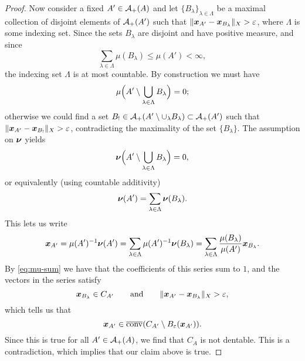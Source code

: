 \begin{proof}
  Now consider a fixed $A' \in \mathcal{A}_{+}(A)$ and let $\{B_{\lambda}\}_{\lambda \in \Lambda}$ be a maximal collection of disjoint elements of $\mathcal{A}_+(A')$ such that $\|\bm{x}_{A'} - \bm{x}_{B_\lambda}\|_{X} > \varepsilon$, where $\Lambda$ is some indexing set.
  Since the sets $B_{\lambda}$ are disjoint and have positive measure, and since
  \begin{equation*}
    \sum_{\lambda \in \Lambda} \mu(B_{\lambda}) \leq \mu(A') < \infty,
  \end{equation*}
  the indexing set $\Lambda$ is at most countable.
  By construction we must have
  \begin{equation}\label{eq:mu-sum}
    \mu\Big(A' \setminus \bigcup_{\lambda \in \Lambda} B_\lambda\Big) = 0;
  \end{equation}
  otherwise we could find a set $B_{!} \in \mathcal{A}_{+}(A' \setminus \cup_{\lambda} B_{\lambda}) \subset \mathcal{A}_{+}(A')$ such that $\|\bm{x}_{A'} - \bm{x}_{B_{!}}\|_{X} > \varepsilon$, contradicting the maximality of the set $
  \{B_{\lambda}\}$.
  The assumption on $\bm{\nu}$ yields
  \begin{equation*}
    \bm{\nu}\Big(A' \setminus \bigcup_{\lambda \in \Lambda} B_\lambda\Big) = 0,
  \end{equation*}
  or equivalently (using countable additivity)
  \begin{equation*}
    \bm{\nu}(A') = \sum_{\lambda \in \Lambda} \bm{\nu}(B_\lambda).
  \end{equation*}
  This lets us write
  \begin{equation*}
      \bm{x}_{A'}
      = \mu(A')^{-1}\bm{\nu}(A') 
      = \sum_{\lambda \in \Lambda} \mu(A')^{-1}\bm{\nu}(B_\lambda) 
      = \sum_{\lambda \in \Lambda} \frac{\mu(B_\lambda)}{\mu(A')} \bm{x}_{B_\lambda}.
  \end{equation*}
  By \eqref{eq:mu-sum} we have that the coefficients of this series sum to $1$, and the vectors in the series satisfy
  \begin{equation*}
    \bm{x}_{B_{\lambda}} \in C_{A'} \qquad \text{and} \qquad \| \bm{x}_{A'}- \bm{x}_{B_\lambda} \|_X > \varepsilon,
  \end{equation*}
  which tells us that
  \begin{equation*}
    \bm{x}_{A'} \in \overline{\mathrm{conv}}(C_{A'} \setminus B_{\varepsilon}(\bm{x}_{A'})).
  \end{equation*}
  Since this is true for all $A' \in \mathcal{A}_{+}(A)$, we find that $C_{A}$ is not dentable.
  This is a contradiction, which implies that our claim above is true.


\end{proof}
